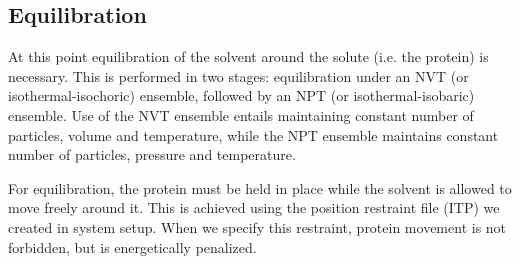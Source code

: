\documentclass[twocolumn]{bmcart}%
\begin{document}
\subsection*{Equilibration}\label{equilibration}

At this point equilibration of the solvent around the solute (i.e. the protein) is necessary. This is performed in two stages: equilibration under an NVT (or isothermal-isochoric) ensemble, followed by an NPT (or isothermal-isobaric) ensemble. Use of the NVT ensemble entails maintaining constant number of particles, volume and temperature, while the NPT ensemble maintains constant number of particles, pressure and temperature.

For equilibration, the protein must be held in place while the solvent is allowed to move freely around it. This is achieved using the position restraint file (ITP) we created in system setup. When we specify this restraint, protein movement is not forbidden, but is energetically penalized.
\end{document}
